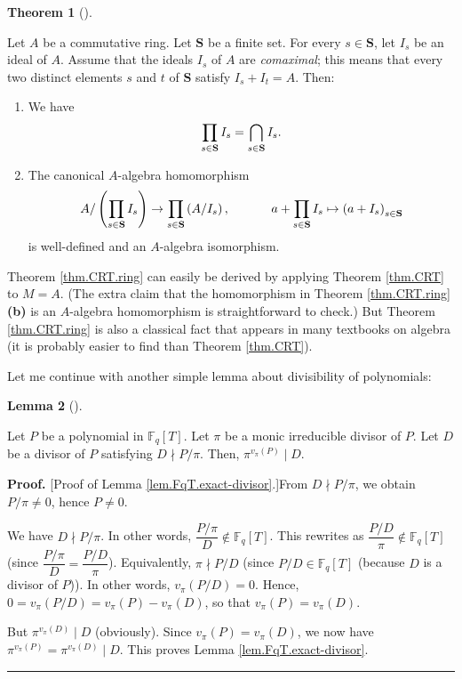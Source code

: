 \documentclass[numbers=enddot,12pt,final,onecolumn,notitlepage]{scrartcl}%
\theoremstyle{definition}
\newtheorem{theo}{Theorem}[section]
\newenvironment{theorem}[1][]
{\begin{theo}[#1]\begin{leftbar}}
{\end{leftbar}\end{theo}}
\newtheorem{lem}[theo]{Lemma}
\newenvironment{lemma}[1][]
{\begin{lem}[#1]\begin{leftbar}}
{\end{leftbar}\end{lem}}
\newenvironment{proof}[1][Proof]{\noindent\textbf{#1.} }{\ \rule{0.5em}{0.5em}}
\let\prodnonlimits\prod
\renewcommand{\prod}{\prodnonlimits\limits}
\begin{document}
\begin{theorem}
\label{thm.CRT.ring}Let $A$ be a commutative ring. Let $\mathbf{S}$ be a
finite set. For every $s\in\mathbf{S}$, let $I_{s}$ be an ideal of $A$. Assume
that the ideals $I_{s}$ of $A$ are \textit{comaximal}; this means that every
two distinct elements $s$ and $t$ of $\mathbf{S}$ satisfy $I_{s}+I_{t}=A$. Then:

\begin{enumerate}
\item[\textbf{(a)}] We have
\[
\prod\limits_{s\in\mathbf{S}}I_{s}=\bigcap_{s\in\mathbf{S}}I_{s}.
\]


\item[\textbf{(b)}] The canonical $A$-algebra homomorphism
\[
A/\left(  \prod\limits_{s\in\mathbf{S}}I_{s}\right)  \rightarrow
\prod\limits_{s\in\mathbf{S}}\left(  A/I_{s}\right)
,\ \ \ \ \ \ \ \ \ \ a+\prod\limits_{s\in\mathbf{S}}I_{s}\mapsto\left(
a+I_{s}\right)  _{s\in\mathbf{S}}%
\]
is well-defined and an $A$-algebra isomorphism.
\end{enumerate}
\end{theorem}

Theorem \ref{thm.CRT.ring} can easily be derived by applying Theorem
\ref{thm.CRT} to $M=A$. (The extra claim that the homomorphism in Theorem
\ref{thm.CRT.ring} \textbf{(b)} is an $A$-algebra homomorphism is
straightforward to check.) But Theorem \ref{thm.CRT.ring} is also a classical
fact that appears in many textbooks on algebra (it is probably easier to find
than Theorem \ref{thm.CRT}).

Let me continue with another simple lemma about divisibility of polynomials:

\begin{lemma}
\label{lem.FqT.exact-divisor}Let $P$ be a polynomial in $\mathbb{F}_{q}\left[
T\right]  $. Let $\pi$ be a monic irreducible divisor of $P$. Let $D$ be a
divisor of $P$ satisfying $D\nmid P/\pi$. Then, $\pi^{v_{\pi}\left(  P\right)
}\mid D$.
\end{lemma}

\begin{proof}
[Proof of Lemma \ref{lem.FqT.exact-divisor}.]From $D\nmid P/\pi$, we obtain
$P/\pi\neq0$, hence $P\neq0$.

We have $D\nmid P/\pi$. In other words, $\dfrac{P/\pi}{D}\notin\mathbb{F}%
_{q}\left[  T\right]  $. This rewrites as $\dfrac{P/D}{\pi}\notin%
\mathbb{F}_{q}\left[  T\right]  $ (since $\dfrac{P/\pi}{D}=\dfrac{P/D}{\pi}$).
Equivalently, $\pi\nmid P/D$ (since $P/D\in\mathbb{F}_{q}\left[  T\right]  $
(because $D$ is a divisor of $P$)). In other words, $v_{\pi}\left(
P/D\right)  =0$. Hence, $0=v_{\pi}\left(  P/D\right)  =v_{\pi}\left(
P\right)  -v_{\pi}\left(  D\right)  $, so that $v_{\pi}\left(  P\right)
=v_{\pi}\left(  D\right)  $.

But $\pi^{v_{\pi}\left(  D\right)  }\mid D$ (obviously). Since $v_{\pi}\left(
P\right)  =v_{\pi}\left(  D\right)  $, we now have $\pi^{v_{\pi}\left(
P\right)  }=\pi^{v_{\pi}\left(  D\right)  }\mid D$. This proves Lemma
\ref{lem.FqT.exact-divisor}.
\end{proof}
\end{document}
